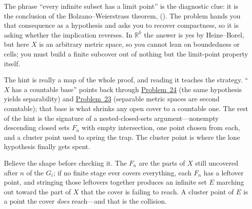 \documentclass[main.tex]{subfiles}
\begin{document}
\begin{Reflection}
The phrase ``every infinite subset has a limit point'' is the diagnostic clue: it is the conclusion of
the Bolzano--Weierstrass theorem,  (). The problem hands you that consequence as a hypothesis and asks you to
recover compactness, so it is asking whether the implication reverses. In $\mathbb R^k$ the answer is yes
by Heine--Borel, but here $X$ is an arbitrary metric space, so you cannot lean on boundedness or cells;
you must build a finite subcover out of nothing but the limit-point property itself.

The hint is really a map of the whole proof, and reading it teaches the strategy. ``$X$ has a countable
base'' points back through \hyperlink{prob:24}{Problem~24} (the same hypothesis yields separability) and
\hyperlink{prob:23}{Problem~23} (separable metric spaces are second countable); that base is what shrinks
any open cover to a countable one. The rest of the hint is the signature of a nested-closed-sets
argument---nonempty descending closed sets $F_n$ with empty intersection, one point chosen from each, and
a cluster point used to spring the trap. The cluster point is where the lone hypothesis finally gets spent.

Believe the shape before checking it. The $F_n$ are the parts of $X$ still uncovered after $n$ of the
$G_i$; if no finite stage ever covers everything, each $F_n$ has a leftover point, and stringing those
leftovers together produces an infinite set $E$ marching out toward the part of $X$ that the cover is
failing to reach. A cluster point of $E$ is a point the cover \emph{does} reach---and that is the
collision.


\end{Reflection}
\end{document}

